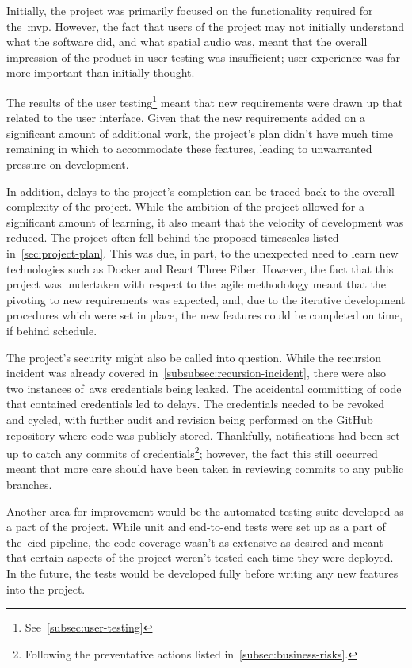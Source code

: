 Initially, the project was primarily focused on the functionality required for the~\gls{mvp}.
However, the fact that users of the project may not initially understand what the software did,
and what spatial audio was, meant that the overall impression of the product in user testing was insufficient;
user experience was far more important than initially thought.

The results of the user testing\footnote{See~\ref{subsec:user-testing}} meant
that new requirements were drawn up that related to the user interface.
Given that the new requirements added on a significant amount of additional work,
the project's plan didn't have much time remaining in which to accommodate these features,
leading to unwarranted pressure on development.

In addition, delays to the project's completion can be traced back to the overall complexity of the project.
While the ambition of the project allowed for a significant amount of learning,
it also meant that the velocity of development was reduced.
The project often fell behind the proposed timescales listed in~\ref{sec:project-plan}.
This was due, in part, to the unexpected need to learn new technologies such as Docker and React Three Fiber.
However,
the fact that this project was undertaken with respect to the~\gls{agile} methodology meant
that the pivoting to new requirements was expected, and,
due to the iterative development procedures which were set in place,
the new features could be completed on time, if behind schedule.

The project's security might also be called into question.
While the recursion incident was already covered in~\ref{subsubsec:recursion-incident},
there were also two instances of~\gls{aws} credentials being leaked.
The accidental committing of code that contained credentials led to delays.
The credentials needed to be revoked and cycled,
with further audit and revision being performed on the GitHub repository where code was publicly stored.
Thankfully,
notifications had been set up
to catch any commits of credentials\footnote{Following the preventative actions listed in~\ref{subsec:business-risks}.};
however, the fact this still occurred meant
that more care should have been taken in reviewing commits to any public branches.

Another area for improvement would be the automated testing suite developed as a part of the project.
While unit and end-to-end tests were set up as a part of the~\gls{cicd} pipeline,
the code coverage wasn't as extensive as desired
and meant that certain aspects of the project weren't tested each time they were deployed.
In the future, the tests would be developed fully before writing any new features into the project.

